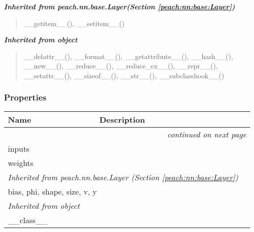 \large{\textbf{\textit{Inherited from peach.nn.base.Layer\textit{(Section \ref{peach:nn:base:Layer})}}}}

\begin{quote}
\_\_getitem\_\_(), \_\_setitem\_\_()
\end{quote}

\large{\textbf{\textit{Inherited from object}}}

\begin{quote}
\_\_delattr\_\_(), \_\_format\_\_(), \_\_getattribute\_\_(), \_\_hash\_\_(), \_\_new\_\_(), \_\_reduce\_\_(), \_\_reduce\_ex\_\_(), \_\_repr\_\_(), \_\_setattr\_\_(), \_\_sizeof\_\_(), \_\_str\_\_(), \_\_subclasshook\_\_()
\end{quote}


  \subsubsection{Properties}

    \vspace{-1cm}
\hspace{\varindent}\begin{longtable}{|p{\varnamewidth}|p{\vardescrwidth}|l}
\cline{1-2}
\cline{1-2} \centering \textbf{Name} & \centering \textbf{Description}& \\
\cline{1-2}
\endhead\cline{1-2}\multicolumn{3}{r}{\small\textit{continued on next page}}\\\endfoot\cline{1-2}
\endlastfoot\raggedright i\-n\-p\-u\-t\-s\- & &\\
\cline{1-2}
\raggedright w\-e\-i\-g\-h\-t\-s\- & &\\
\cline{1-2}
\multicolumn{2}{|l|}{\textit{Inherited from peach.nn.base.Layer \textit{(Section \ref{peach:nn:base:Layer})}}}\\
\multicolumn{2}{|p{\varwidth}|}{\raggedright bias, phi, shape, size, v, y}\\
\cline{1-2}
\multicolumn{2}{|l|}{\textit{Inherited from object}}\\
\multicolumn{2}{|p{\varwidth}|}{\raggedright \_\_class\_\_}\\
\cline{1-2}
\end{longtable}

